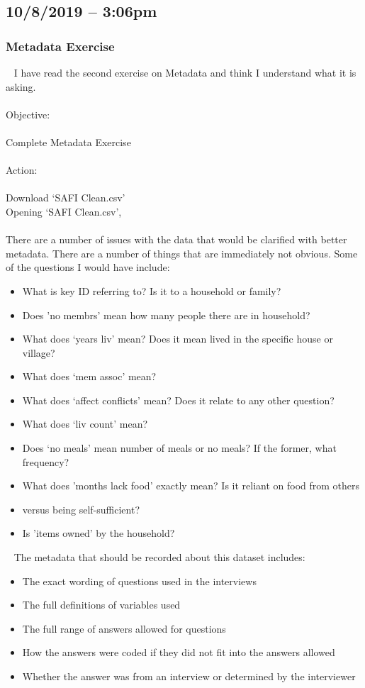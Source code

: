\documentclass{article}
\begin{document}
\subsection*{10/8/2019 – 3:06pm}
\subsubsection*{Metadata Exercise}
 
I have read the second exercise on Metadata and think I understand what it is asking.
\\\\
Objective:\\\\
Complete Metadata Exercise\\\\
Action:\\\\
Download ‘SAFI Clean.csv’\\
Opening ‘SAFI Clean.csv’,\\\\
There are a number of issues with the data that would be clarified with better metadata. There are a number of things that are immediately not obvious. Some of the questions I would have include:
\begin{itemize}
\item What is key ID referring to? Is it to a household or family?
\item Does 'no membrs' mean how many people there are in household?
\item What does ‘years liv’ mean? Does it mean lived in the specific house or village?
\item What does ‘mem assoc’ mean?
\item What does ‘affect conflicts’ mean? Does it relate to any other question?
\item What does ‘liv count’ mean?
\item Does ‘no meals’ mean number of meals or no meals? If the former, what frequency?
\item What does 'months lack food' exactly mean? Is it reliant on food from others \item versus being self-sufficient?
\item Is 'items owned' by the household?
\end{itemize} 
The metadata that should be recorded about this dataset includes:
\begin{itemize}
\item The exact wording of questions used in the interviews
\item The full definitions of variables used
\item The full range of answers allowed for questions
\item How the answers were coded if they did not fit into the answers allowed
\item Whether the answer was from an interview or determined by the interviewer
\end{itemize}
\end{document}
